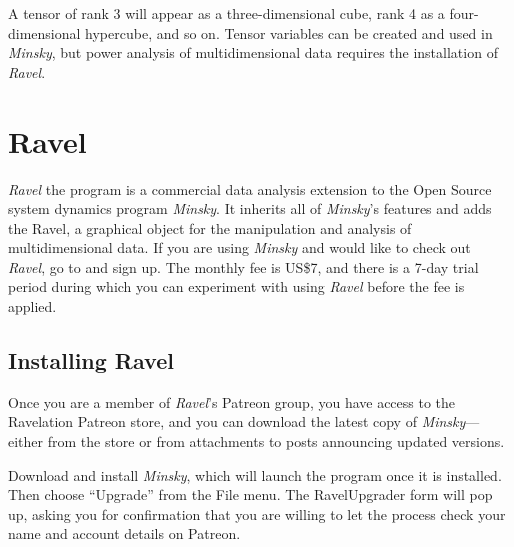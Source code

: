 A tensor of rank 3 will appear as a three-dimensional cube, rank 4
as a four-dimensional hypercube, and so on. Tensor variables can be
created and used in \emph{Minsky}, but power analysis of multidimensional
data requires the installation of \emph{Ravel}.

\section{Ravel}

\label{Ravel}\emph{Ravel} the program is a commercial data analysis
extension to the Open Source system dynamics program \emph{Minsky}.
It inherits all of \emph{Minsky}'s features and adds the
Ravel\texttrademark,
a graphical object for the manipulation and analysis of multidimensional
data. If you are using \emph{Minsky} and would like to check out \emph{Ravel},
go to  and
sign up. The monthly fee is US\$7, and there is a
7-day trial period during which you can experiment with using \emph{Ravel}
before the fee is applied.

\subsection{Installing Ravel}

Once you are a member of \emph{Ravel}'s Patreon group, you have access
to the Ravelation Patreon store, and you can download the latest copy
of \emph{Minsky}---either from the store or from attachments to posts
announcing updated versions.

Download and install \emph{Minsky}, which will launch the program
once it is installed. Then choose ``Upgrade'' from the File menu.
The RavelUpgrader form will pop up, asking you for confirmation that
you are willing to let the process check your name and account details
on Patreon.

